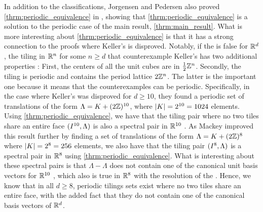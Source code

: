 \documentclass[../thesis.tex]{subfiles}
\begin{document}
In addition to the classifications, Jorgensen and Pedersen also proved \cref{thrm:periodic_equivalence} in \cite{jorgensenSpectralPairsCartesian2001}, showing that \cref{thrm:periodic_equivalence} is a solution to the periodic case of the main result, \cref{thrm:main_result}. What is more interesting about \cref{thrm:periodic_equivalence} is that it has a strong connection to the proofs where Keller's  is disproved. Notably, if the  is false for $\mathbb{R}^d$, the tiling in $\mathbb{R}^n$ for some $n\geq d$ that counterexample Keller's  has two additional properties \cite{lagariasKellerCubetilingConjecture1992}: First, the centers of all the unit cubes are in $\frac{1}{2}\mathbb{Z}^n$. Secondly, the tiling is periodic and contains the period lattice $2\mathbb{Z}^n$. The latter is the important one because it means that the counterexamples can be periodic. Specifically, in the case where Keller's  was disproved for $d\geq10$, they found a periodic set of translations of the form $\Lambda= K + (2\mathbb{Z})^{10}$, where $|K| = 2^{10} = 1024$ elements. Using \cref{thrm:periodic_equivalence}, we have that the tiling pair where no two tiles share an entire face $(I^{10},\Lambda)$ is also a spectral pair in $\mathbb{R}^{10}$ \cite{jorgensenSpectralPairsCartesian2001}. As Mackey \cite{mackeyCubeTilingDimension2002} improved this result further by finding a set of translations of the form $\Lambda= K + (2\mathbb{Z})^{8}$ where $|K| = 2^{8} = 256$ elements, we also have that the tiling pair $(I^{8},\Lambda)$ is a spectral pair in $\mathbb{R}^8$ using \cref{thrm:periodic_equivalence}. What is interesting about these spectral pairs is that $\Lambda-\Lambda$ does not contain one of the canonical unit basis vectors for $\mathbb{R}^{10}$ \cite{jorgensenSpectralPairsCartesian2001}, which also is true in $\mathbb{R}^{8}$ with the resolution of the  \cite{brakensiekResolutionKellerConjecture2020}. Hence, we know that in all $d\geq8$, periodic tilings sets exist where no two tiles share an entire face, with the added fact that they do not contain one of the canonical basis vectors of $\mathbb{R}^d$.
\end{document}
